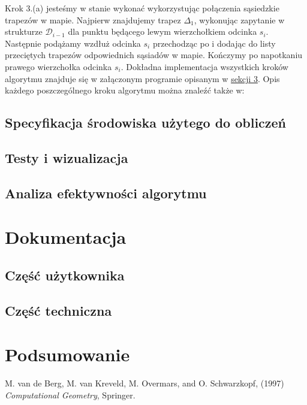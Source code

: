 \documentclass[11pt,a4paper]{article}
\begin{document}
Krok 3.(a) jesteśmy w stanie wykonać wykorzystując 
połączenia sąsiedzkie trapezów w mapie. Najpierw znajdujemy
trapez $\Delta_1$, wykonując zapytanie w strukturze $\mathscr{D}_{i - 1}$
dla punktu będącego lewym wierzchołkiem odcinka $s_i$.
Następnie podążamy wzdłuż odcinka $s_i$ przechodząc po i dodając do
listy przeciętych trapezów odpowiednich sąsiadów w mapie. Kończymy
po napotkaniu prawego wierzchołka odcinka $s_i$.
Dokładna implementacja wszystkich kroków algorytmu
znajduje się w załączonym programie opisanym 
w \hyperlink{section.3}{sekcji 3}. Opis każdego 
poszczególnego kroku algorytmu można znaleźć także
w: \cite[s. 129-133]{compgeo}

\subsection{Specyfikacja środowiska użytego do obliczeń}

\subsection{Testy i wizualizacja}

\subsection{Analiza efektywności algorytmu}

\section{Dokumentacja}

\subsection{Część użytkownika}

\subsection{Część techniczna}

\section{Podsumowanie}

\begin{thebibliography}{999}
    M. van de Berg, M. van Kreveld, M. Overmars, and O. Schwarzkopf,
    (1997)
    \emph{Computational Geometry},
    Springer.
\end{thebibliography}
\end{document}

